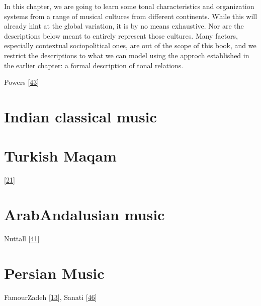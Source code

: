\documentclass[letterpaper,10pt,english]{sphinxmanual}
\begin{document}
\sphinxAtStartPar
In this chapter, we are going to learn some tonal characteristics and organization systems from a range of
musical cultures from different continents. While this will already hint at the global variation,
it is by no means exhaustive. Nor are the descriptions below meant to entirely represent those cultures.
Many factors, especially contextual sociopolitical ones, are out of the scope of this book, and we
restrict the descriptions to what we can model using the approch established in the earlier chapter:
a formal description of tonal relations.

\sphinxAtStartPar
Powers  {[}\hyperlink{cite.8_bibliography:id17}{43}{]}


\section{Indian classical music}
\label{\detokenize{2_scales_modes:indian-classical-music}}

\section{Turkish Maqam}
\label{\detokenize{2_scales_modes:turkish-maqam}}
\sphinxAtStartPar
{} {[}\hyperlink{cite.8_bibliography:id46}{21}{]}


\section{Arab\sphinxhyphen{}Andalusian music}
\label{\detokenize{2_scales_modes:arab-andalusian-music}}
\sphinxAtStartPar
Nuttall  {[}\hyperlink{cite.8_bibliography:id65}{41}{]}


\section{Persian Music}
\label{\detokenize{2_scales_modes:persian-music}}
\sphinxAtStartPar
FamourZadeh {[}\hyperlink{cite.8_bibliography:id63}{13}{]}, Sanati {[}\hyperlink{cite.8_bibliography:id59}{46}{]}
\end{document}
